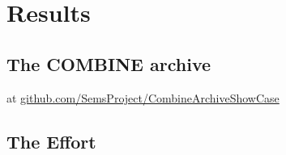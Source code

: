 
\section{Results}

\subsection{The COMBINE archive}
at 
\href{https://github.com/SemsProject/CombineArchiveShowCase}{github.com/SemsProject/CombineArchiveShowCase}

\subsection{The Effort}


